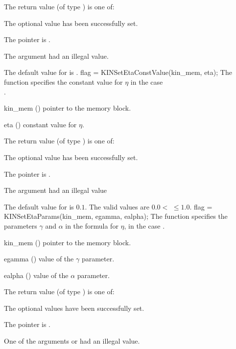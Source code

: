 {
  The return value  (of type ) is one of:
  \begin{args}
  \item[\Id{KIN\_SUCCESS}] 
    The optional value has been successfully set.
  \item[\Id{KIN\_MEM\_NULL}]
    The  pointer is .
  \item[\Id{KIN\_ILL\_INPUT}]
    The argument  had an illegal value.
  \end{args}
}
{
  The default value for  is .
}
{
flag = KINSetEtaConstValue(kin\_mem, eta);
}
{
  The function  specifies the constant value
  for $\eta$ in the case \\ .
}
{
  \begin{args}
  \item[kin\_mem] ()
    pointer to the {\kinsol} memory block.
  \item[eta] ()
    constant value for $\eta$.
  \end{args}
}
{
  The return value  (of type ) is one of:
  \begin{args}
  \item[\Id{KIN\_SUCCESS}] 
    The optional value has been successfully set.
  \item[\Id{KIN\_MEM\_NULL}]
    The  pointer is .
  \item[\Id{KIN\_ILL\_INPUT}]
    The argument  had an illegal value
  \end{args}
}
{
  The default value for  is $0.1$.
  The valid values are $0.0 <$  $\le 1.0$.
}
{
flag = KINSetEtaParams(kin\_mem, egamma, ealpha);
}
{
  The function  specifies the parameters $\gamma$ and
  $\alpha$ in the formula for $\eta$, in the case .
}
{
  \begin{args}
  \item[kin\_mem] ()
    pointer to the {\kinsol} memory block.
  \item[egamma] ()
    value of the $\gamma$ parameter.
  \item[ealpha] ()
    value of the $\alpha$ parameter.
  \end{args}
}
{
  The return value  (of type ) is one of:
  \begin{args}
  \item[\Id{KIN\_SUCCESS}] 
    The optional values have been successfully set.
  \item[\Id{KIN\_MEM\_NULL}]
    The  pointer is .
  \item[\Id{KIN\_ILL\_INPUT}]
    One of the arguments  or  had an illegal value.
  \end{args}
}
